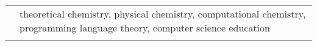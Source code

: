 \documentclass[letterpaper, 11pt]{article}
\begin{document}

\vspace{0.5cm}


\setlength{\tabcolsep}{8pt}

\begin{longtable}{p{1.3in}p{4.8in}}

	\nohyphens{\color{Blue}{Research Interests}}
	 & theoretical chemistry, physical chemistry, computational chemistry, programming language theory, computer science education                                                                                                                                                                                                                                                               \\
	 &                                                                                                                                                                                                                                                                                                                                                                                           \\


\end{longtable}
\end{document}
